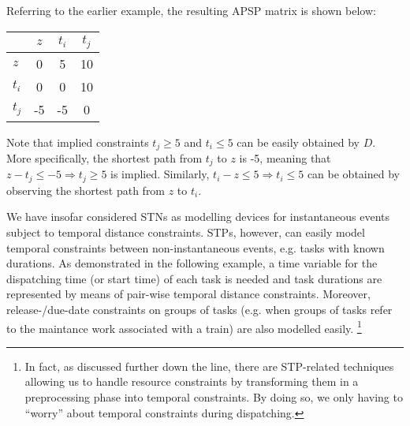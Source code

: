 	\begin{example}
		Referring to the earlier example,
		the resulting APSP matrix is shown below:
		\begin{center}
		\begin{tabular}{l|	c c c}
					&	$z$	&	$t_i$	&	$t_j$	\\ \hline
			$z$	&	0		&	5		&	10	\\ 
			$t_i$ &	0		&	0		&	10	\\ 
			$t_j$	&	-5	&	-5		&	0
		\end{tabular}
		\end{center}
		Note that implied constraints $t_j \geq 5$ and $t_i \leq 5$ can be easily obtained by $D$.
		More specifically, the shortest path from $t_j$ to $z$ is -5,
		meaning that $z - t_j \leq -5 \Rightarrow t_j \geq 5$ is implied.
		Similarly, $t_i -z \leq 5 \Rightarrow t_i \leq 5$ can be obtained by observing the shortest path from $z$ to $t_i$.
	\end{example}

	We have insofar considered STNs as modelling devices for instantaneous events subject to temporal distance constraints.
	STPs, however, can easily model temporal constraints between non-instantaneous events, e.g. tasks with known durations.
	As demonstrated in the following example, a time variable for the dispatching time (or start time) of each task is needed and 
	task durations are represented by means of pair-wise temporal distance constraints. 
	Moreover, release-/due-date constraints on groups of tasks 
	(e.g. when groups of tasks refer to the maintance work associated with a train) are also modelled easily.
	\footnote{In fact, as discussed further down the line, there are STP-related techniques allowing us to 
	handle resource constraints by transforming them in a preprocessing phase into temporal constraints.
	By doing so, we only having to ``worry'' about temporal constraints during dispatching.}

